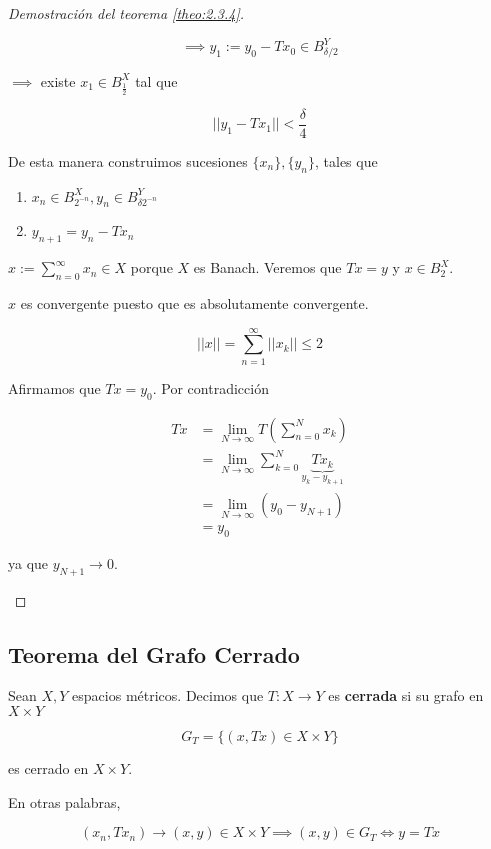 \begin{proof}[Demostración del teorema \ref{theo:2.3.4}]
\begin{enumerate}
        \[\implies y_1:=y_0-Tx_0\in B_{\delta/2}^Y\]

        $\implies$ existe $x_1\in B_{\frac{1}{2}}^X$ tal que 

        \[||y_1-Tx_1||<\frac{\delta}{4}\]

        De esta manera construimos sucesiones $\{x_n\},\{y_n\}$, tales que

        \begin{enumerate}
            \item $x_n\in B_{2^{-n}}^X, y_n\in B_{\delta 2^{-n}}^Y$
            \item $y_{n+1}=y_n-Tx_n$
        \end{enumerate}

        $x:=\displaystyle\sum_{n=0}^\infty x_n\in X$ porque $X$ es Banach. Veremos que $Tx=y$ y $x\in B_2^X$.

        $x$ es convergente puesto que es absolutamente convergente.

        \[||x||=\sum_{n=1}^\infty ||x_k||\leq 2\]

        Afirmamos que $Tx=y_0$. Por contradicción

        \begin{align*}Tx&=\lim_{N\to\infty} T(\sum_{n=0}^N x_k)\\
        &=\lim_{N\to\infty} \sum_{k=0}^N \underbrace{Tx_k}_{y_k-y_{k+1}}\\
        &=\lim_{N\to\infty} (y_0-y_{N+1})\\\
        &=y_0
    \end{align*}

    ya que $y_{N+1}\to 0$.
    \end{enumerate}
\end{proof}

\subsection{Teorema del Grafo Cerrado}

\begin{fdefinition}
    Sean $X,Y$ espacios métricos. Decimos que $T:X\to Y$ es \textbf{cerrada} si su grafo en $X\times Y$

    \[G_T=\{(x,Tx)\in X\times Y\}\]

    es cerrado en $X\times Y$.
\end{fdefinition}

En otras palabras,

\[(x_n,Tx_n)\to (x,y)\in X\times Y\implies (x,y)\in G_T\iff y=Tx\]

